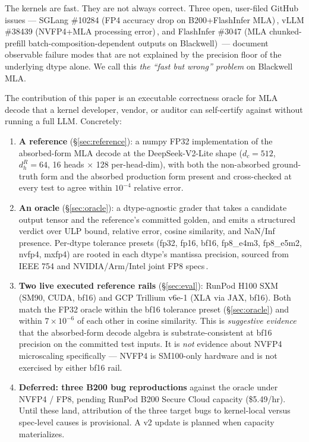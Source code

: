 \documentclass[11pt]{article}
\begin{document}
The kernels are fast. They are not always correct. Three open,
user-filed GitHub issues --- SGLang \#10284 (FP4 accuracy drop on
B200+FlashInfer MLA)\,\citep{sglang-10284}, vLLM \#38439 (NVFP4+MLA
processing error)\,\citep{vllm-38439}, and FlashInfer \#3047 (MLA
chunked-prefill batch-composition-dependent outputs on Blackwell)\,\citep{flashinfer-3047}
--- document observable failure modes that are not explained by the
precision floor of the underlying dtype alone. We call this
\emph{the ``fast but wrong'' problem} on Blackwell MLA.

The contribution of this paper is an executable correctness oracle for
MLA decode that a kernel developer, vendor, or auditor can self-certify
against without running a full LLM. Concretely:

\begin{enumerate}
\item \textbf{A reference} (\S\ref{sec:reference}): a numpy FP32
      implementation of the absorbed-form MLA decode at the
      DeepSeek-V2-Lite shape (\(d_c{=}512\), \(d_h^R{=}64\), 16 heads
      \(\times\) 128 per-head-dim), with both the non-absorbed
      ground-truth form and the absorbed production form present and
      cross-checked at every test to agree within \(10^{-4}\) relative
      error.
\item \textbf{An oracle} (\S\ref{sec:oracle}): a dtype-agnostic grader
      that takes a candidate output tensor and the reference's committed
      golden, and emits a structured verdict over ULP bound, relative
      error, cosine similarity, and NaN/Inf presence. Per-dtype
      tolerance presets (fp32, fp16, bf16, fp8\_e4m3, fp8\_e5m2, nvfp4,
      mxfp4) are rooted in each dtype's mantissa precision, sourced from
      IEEE 754 and NVIDIA/Arm/Intel joint FP8 specs\,\citep{fp8-formats}.
\item \textbf{Two live executed reference rails} (\S\ref{sec:eval}):
      RunPod H100 SXM (SM90, CUDA, bf16) and GCP Trillium v6e-1 (XLA
      via JAX, bf16). Both match the FP32 oracle within the bf16
      tolerance preset (\S\ref{sec:oracle}) and within $7\times 10^{-6}$
      of each other in cosine similarity. This is \emph{suggestive
      evidence} that the absorbed-form decode algebra is
      substrate-consistent at bf16 precision on the committed test
      inputs. It is \emph{not} evidence about NVFP4 microscaling
      specifically --- NVFP4 is SM100-only hardware and is not
      exercised by either bf16 rail.
\item \textbf{Deferred: three B200 bug reproductions} against the oracle
      under NVFP4 / FP8, pending RunPod B200 Secure Cloud capacity
      (\$5.49/hr). Until these land, attribution of the three target
      bugs to kernel-local versus spec-level causes is provisional.
      A v2 update is planned when capacity materializes.
\end{enumerate}
\end{document}
